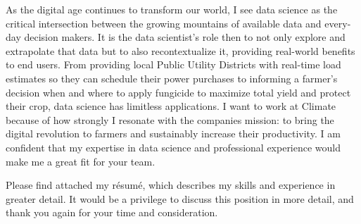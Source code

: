 \documentclass[14pt, a4paper]{./shared/awesome-cv}
\begin{document}
\begin{cvletter}
As the digital age continues to transform our world, I see data science as the critical intersection between the growing mountains of available data and every-day decision makers. It is the data scientist's role then to not only explore and extrapolate that data but to also recontextualize it, providing real-world benefits to end users. From providing local Public Utility Districts with real-time load estimates so they can schedule their power purchases to informing a farmer's decision when and where to apply fungicide to maximize total yield and protect their crop, data science has limitless applications. I want to work at Climate because of how strongly I resonate with the companies mission: to bring the digital revolution to farmers and sustainably increase their productivity. I am confident that my expertise in data science and professional experience would make me a great fit for your team.

Please find attached my résumé, which describes my skills and experience in greater detail. It would be a privilege to discuss this position in more detail, and thank you again for your time and consideration.

\end{cvletter}

\makeletterclosing
\end{document}
